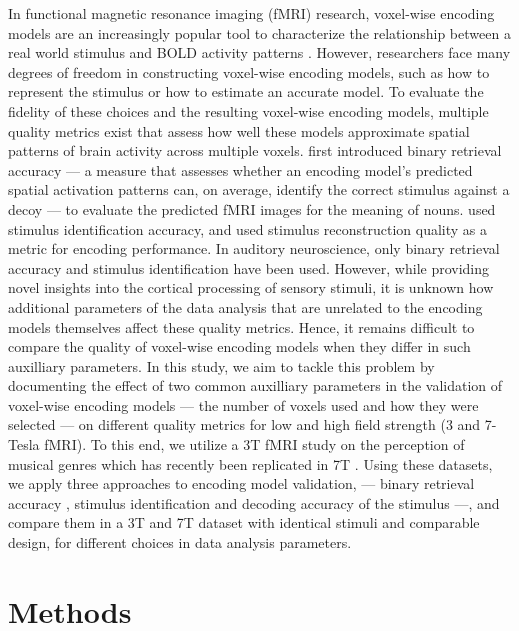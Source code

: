 In functional magnetic resonance imaging (f{MRI}) research, voxel-wise encoding models are an increasingly popular tool to characterize the relationship between a real world stimulus and BOLD activity patterns \citep{TD+06,KG+08,NG11,huth2012continuous,holdgraf2016rapid}. However, researchers face many degrees of freedom in constructing voxel-wise encoding models, such as how to represent the stimulus or how to estimate an accurate model. To evaluate the fidelity of these choices and the resulting voxel-wise encoding models, multiple quality metrics exist that assess how well these models approximate spatial patterns of brain activity across multiple voxels. \citet{ML08} first introduced binary retrieval accuracy --- a measure that assesses whether an encoding model's predicted spatial activation patterns can, on average, identify the correct stimulus against a decoy --- to evaluate the predicted f{MRI} images for the meaning of nouns. \citet{KG+08} used stimulus identification accuracy, and \citet{NG09} used stimulus reconstruction quality as a metric for encoding performance. In auditory neuroscience, only binary retrieval accuracy \citep{CTK+2012,hoefle2018identifying} and stimulus identification \citep{SF14,allen2018encoding} have been used.
However, while providing novel insights into the cortical processing of sensory stimuli, it is unknown how additional parameters of the data analysis that are unrelated to the encoding models themselves affect these quality metrics. Hence, it remains difficult to compare the quality of voxel-wise encoding models when they differ in such auxilliary parameters.
In this study, we aim to tackle this problem by documenting the effect of two common auxilliary parameters in the validation of voxel-wise encoding models --- the number of voxels used and how they were selected --- on different quality metrics for low and high field strength (3 and 7-Tesla f{MRI}). To this end, we utilize a 3T f{MRI} study on the perception of musical genres \citep{CTK+2012} which has recently been replicated in 7T \citep{HDH+2015}. Using these datasets, we apply three approaches to encoding model validation, --- binary retrieval accuracy \citep{ML08}, stimulus identification \citep{KG+08,SF14} and decoding accuracy of the stimulus \citep{NG09} ---, and compare them in a 3T and 7T dataset with identical stimuli and comparable design, for different choices in data analysis parameters.

\section*{Methods}

